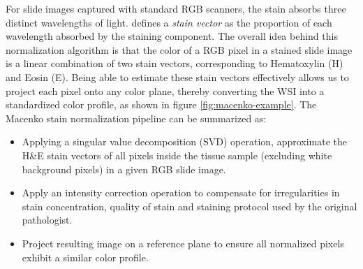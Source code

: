 \documentclass{l4proj}
\begin{document}
For slide images captured with standard RGB scanners, the stain absorbs three distinct wavelengths of light. \cite{macenko2009method} defines a \textit{stain vector} as the proportion of each wavelength absorbed by the staining component. The overall idea behind this normalization algorithm is that the color of a RGB pixel in a stained slide image is a linear combination of two stain vectors, corresponding to Hematoxylin (H) and Eosin (E). Being able to estimate these stain vectors effectively allows us to project each pixel onto any color plane, thereby converting the WSI into a standardized color profile, as shown in figure \ref{fig:macenko-example}. The Macenko stain normalization pipeline can be summarized as:
\begin{itemize}
    \item Applying a singular value decomposition (SVD) operation, approximate the H\&E stain vectors of all pixels inside the tissue sample (excluding white background pixels) in a given RGB slide image. 
    \item Apply an intensity correction operation to compensate for irregularities in stain concentration, quality of stain and staining protocol used by the original pathologist. 
    \item Project resulting image on a reference plane to ensure all normalized pixels exhibit a similar color profile. 
\end{itemize}
\hfill\\
\end{document}
